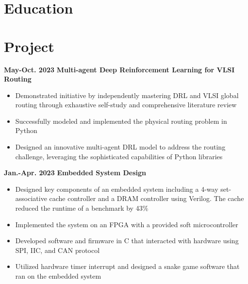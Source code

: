 \documentclass[11pt,a4paper,sans]{moderncv}
\begin{document}
\makecvtitle

\section{Education}

\section{Project}

\cventry
{\textnormal{\textbf{May-Oct. 2023}}}
{\textnormal{\textbf{Multi-agent Deep Reinforcement Learning for VLSI Routing}}}
{}{}{}
{
    \begin{itemize}
    \item Demonstrated initiative by independently mastering DRL and VLSI global routing through exhaustive self-study and comprehensive literature review
    \item Successfully modeled and implemented the physical routing problem in Python
    \item Designed an innovative multi-agent DRL model to address the routing challenge, leveraging the sophisticated capabilities of Python libraries
\end{itemize}
}

\cventry
{\textnormal{\textbf{Jan.-Apr. 2023}}}
{\textnormal{\textbf{Embedded System Design}}}
{}{}{}
{
    \begin{itemize}
    \item Designed key components of an embedded system including a 4-way set-associative cache controller and a DRAM controller using Verilog. The cache reduced the runtime of a benchmark by 43\%
    \item Implemented the system on an FPGA with a provided soft microcontroller 
    \item Developed software and firmware in C that interacted with hardware using SPI, IIC, and CAN protocol 
    \item Utilized hardware timer interrupt and designed a snake game software that ran on the embedded system
\end{itemize}
}
\end{document}
